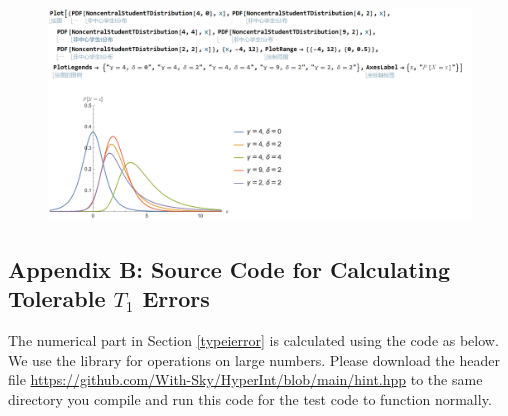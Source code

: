 \documentclass[12pt]{article}
\begin{document}
\begin{figure}[htbp]
    \centering
    \includegraphics[scale=0.5]{img/pdf_t_code.png}
\end{figure}

\subsection{Appendix B: Source Code for Calculating Tolerable $T_1$ Errors}
\label{cppcode}

The numerical part in Section \ref{typeierror} is calculated using the code as below. We use the library \cite{Github} for operations on large numbers. Please download the header file \href{https://github.com/With-Sky/HyperInt/blob/main/hint.hpp}{https://github.com/With-Sky/HyperInt/blob/main/hint.hpp} to the same directory you compile and run this code for the test code to function normally. 
\end{document}
